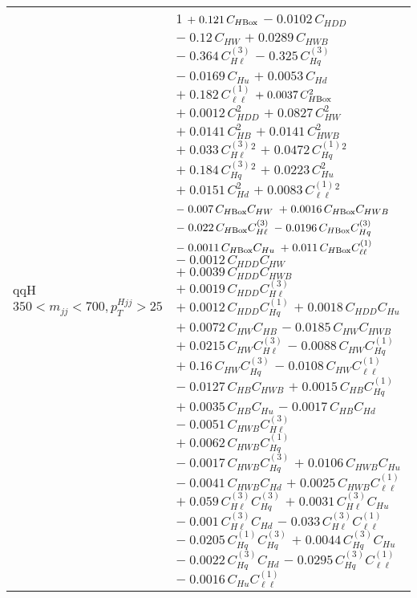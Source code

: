 \begin{tabular}{l|p{}}
    qqH $350 < m_{jj} < 700, p_{T}^{Hjj} > 25$ & 1 $+\;0.121\,C_{H\rm{Box}}$ $-\;0.0102\,C_{HDD}$ $-\;0.12\,C_{HW}$ $+\;0.0289\,C_{HWB}$ $-\;0.364\,C^{(3)}_{H\ell}$ $-\;0.325\,C^{(3)}_{Hq}$ $-\;0.0169\,C_{Hu}$ $+\;0.0053\,C_{Hd}$ $+\;0.182\,C^{(1)}_{\ell\ell}$ $+\;0.0037\,C_{H\rm{Box}}^{2}$ $+\;0.0012\,C_{HDD}^{2}$ $+\;0.0827\,C_{HW}^{2}$ $+\;0.0141\,C_{HB}^{2}$ $+\;0.0141\,C_{HWB}^{2}$ $+\;0.033\,C^{(3)}_{H\ell}^{2}$ $+\;0.0472\,C^{(1)}_{Hq}^{2}$ $+\;0.184\,C^{(3)}_{Hq}^{2}$ $+\;0.0223\,C_{Hu}^{2}$ $+\;0.0151\,C_{Hd}^{2}$ $+\;0.0083\,C^{(1)}_{\ell\ell}^{2}$ $-\;0.007\,C_{H\rm{Box}}C_{HW}$ $+\;0.0016\,C_{H\rm{Box}}C_{HWB}$ $-\;0.022\,C_{H\rm{Box}}C^{(3)}_{H\ell}$ $-\;0.0196\,C_{H\rm{Box}}C^{(3)}_{Hq}$ $-\;0.0011\,C_{H\rm{Box}}C_{Hu}$ $+\;0.011\,C_{H\rm{Box}}C^{(1)}_{\ell\ell}$ $-\;0.0012\,C_{HDD}C_{HW}$ $+\;0.0039\,C_{HDD}C_{HWB}$ $+\;0.0019\,C_{HDD}C^{(3)}_{H\ell}$ $+\;0.0012\,C_{HDD}C^{(1)}_{Hq}$ $+\;0.0018\,C_{HDD}C_{Hu}$ $+\;0.0072\,C_{HW}C_{HB}$ $-\;0.0185\,C_{HW}C_{HWB}$ $+\;0.0215\,C_{HW}C^{(3)}_{H\ell}$ $-\;0.0088\,C_{HW}C^{(1)}_{Hq}$ $+\;0.16\,C_{HW}C^{(3)}_{Hq}$ $-\;0.0108\,C_{HW}C^{(1)}_{\ell\ell}$ $-\;0.0127\,C_{HB}C_{HWB}$ $+\;0.0015\,C_{HB}C^{(1)}_{Hq}$ $+\;0.0035\,C_{HB}C_{Hu}$ $-\;0.0017\,C_{HB}C_{Hd}$ $-\;0.0051\,C_{HWB}C^{(3)}_{H\ell}$ $+\;0.0062\,C_{HWB}C^{(1)}_{Hq}$ $-\;0.0017\,C_{HWB}C^{(3)}_{Hq}$ $+\;0.0106\,C_{HWB}C_{Hu}$ $-\;0.0041\,C_{HWB}C_{Hd}$ $+\;0.0025\,C_{HWB}C^{(1)}_{\ell\ell}$ $+\;0.059\,C^{(3)}_{H\ell}C^{(3)}_{Hq}$ $+\;0.0031\,C^{(3)}_{H\ell}C_{Hu}$ $-\;0.001\,C^{(3)}_{H\ell}C_{Hd}$ $-\;0.033\,C^{(3)}_{H\ell}C^{(1)}_{\ell\ell}$ $-\;0.0205\,C^{(1)}_{Hq}C^{(3)}_{Hq}$ $+\;0.0044\,C^{(3)}_{Hq}C_{Hu}$ $-\;0.0022\,C^{(3)}_{Hq}C_{Hd}$ $-\;0.0295\,C^{(3)}_{Hq}C^{(1)}_{\ell\ell}$ $-\;0.0016\,C_{Hu}C^{(1)}_{\ell\ell}$ \\

\end{tabular}
